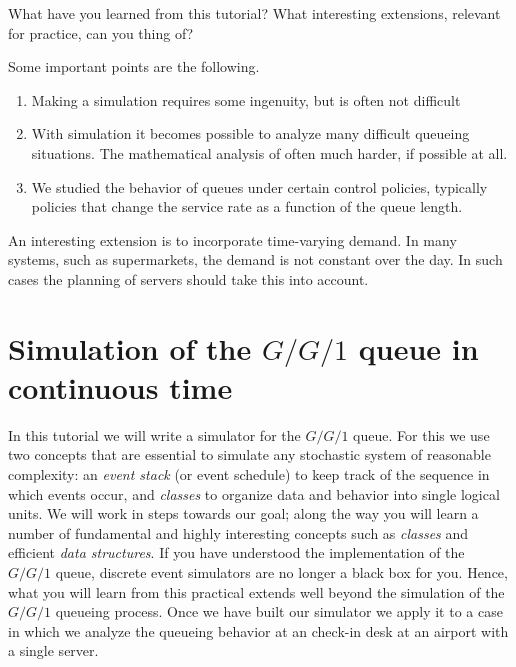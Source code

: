 \begin{exercise}
  What have you learned from this tutorial? What interesting extensions, relevant for practice,  can you thing of?
  \begin{solution}
    Some important points are the following.
    \begin{enumerate}
    \item  Making a  simulation requires some ingenuity, but is often not difficult
    \item With simulation it becomes possible to analyze many difficult queueing situations. The mathematical analysis of often much harder, if possible at all.
    \item We studied the behavior of queues under certain control policies, typically policies that change the service rate as a function of the queue length.
    \end{enumerate}

An interesting extension is to incorporate time-varying demand. In many systems, such as supermarkets, the demand is not constant over the day. In such cases the planning of servers should take this into account. 

  \end{solution}
\end{exercise}

\clearpage

\section{Simulation of the $G/G/1$ queue in continuous time}
\label{sec:simulation-gg1-queue}

In this tutorial we will write a simulator for the $G/G/1$ queue.
For this we use two concepts that are essential to simulate any stochastic system of reasonable complexity: an \emph{event stack} (or event schedule) to keep track of the sequence in which events occur, and \emph{classes} to organize data and behavior into single logical units.
We will work in steps towards our goal; along the way you will learn a number of fundamental and highly interesting concepts such as \emph{classes} and efficient \emph{data structures}.
If you have understood the implementation of the $G/G/1$ queue, discrete event simulators are no longer a black box for you.
Hence, what you will learn from this practical extends well beyond the simulation of the $G/G/1$ queueing process.
Once we have built our simulator we apply it to a case in which we analyze the queueing behavior at an check-in desk at an airport with a single server.

